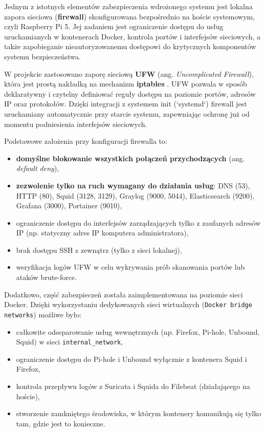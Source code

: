 \documentclass[
    left=2.5cm,         %
    right=2.5cm,        %
    top=2.5cm,          %
    bottom=3cm,         %
    bindingoffset=6mm,  %
    nohyphenation=true %
]{eiti/eiti-thesis} %
\begin{document}
Jednym z istotnych elementów zabezpieczenia wdrożonego systemu jest lokalna zapora sieciowa (\textbf{firewall}) skonfigurowana bezpośrednio na hoście systemowym, czyli Raspberry Pi 5. Jej zadaniem jest ograniczenie dostępu do usług uruchamianych w kontenerach Docker, kontrola portów i interfejsów sieciowych, a także zapobieganie nieautoryzowanemu dostępowi do krytycznych komponentów systemu bezpieczeństwa.

W projekcie zastosowano zaporę sieciową \textbf{UFW} (ang. \textit{Uncomplicated Firewall}), która jest prostą nakładką na mechanizm \textbf{iptables} \cite{ufw-docs}. UFW pozwala w sposób deklaratywny i czytelny definiować reguły dostępu na poziomie portów, adresów IP oraz protokołów. Dzięki integracji z systemem init (`systemd`) firewall jest uruchamiany automatycznie przy starcie systemu, zapewniając ochronę już od momentu podniesienia interfejsów sieciowych.

Podstawowe założenia przy konfiguracji firewalla to:
\begin{itemize}
    \item \textbf{domyślne blokowanie wszystkich połączeń przychodzących} (ang. \textit{default deny}),
    \item \textbf{zezwolenie tylko na ruch wymagany do działania usług}: DNS (53), HTTP (80), Squid (3128, 3129), Graylog (9000, 5044), Elasticsearch (9200), Grafana (3000), Portainer (9010),
    \item ograniczenie dostępu do interfejsów zarządzających tylko z zaufanych adresów IP (np. statyczny adres IP komputera administratora),
    \item brak dostępu SSH z zewnątrz (tylko z sieci lokalnej),
    \item weryfikacja logów UFW w celu wykrywania prób skanowania portów lub ataków brute-force.
\end{itemize}

Dodatkowo, część zabezpieczeń została zaimplementowana na poziomie sieci Docker. Dzięki wykorzystaniu dedykowanych sieci wirtualnych (\texttt{Docker bridge networks}) możliwe było:
\begin{itemize}
    \item całkowite odseparowanie usług wewnętrznych (np. Firefox, Pi-hole, Unbound, Squid) w sieci \texttt{internal\_network},
    \item ograniczenie dostępu do Pi-hole i Unbound wyłącznie z kontenera Squid i Firefox,
    \item kontrola przepływu logów z Suricata i Squida do Filebeat (działającego na hoście),
    \item stworzenie zamkniętego środowiska, w którym kontenery komunikują się tylko tam, gdzie jest to konieczne.
\end{itemize}
\end{document}
